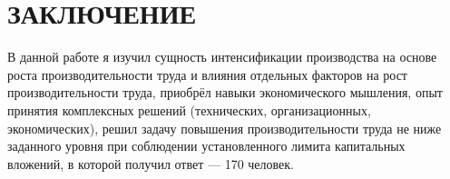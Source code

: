 \section*{ЗАКЛЮЧЕНИЕ}

В данной работе я изучил сущность интенсификации производства на основе роста
производительности труда и влияния отдельных факторов на рост производительности труда,
приобрёл навыки экономического мышления, опыт принятия комплексных
решений (технических, организационных, экономических), решил задачу повышения
производительности труда не ниже заданного уровня при соблюдении
установленного лимита капитальных вложений, в которой получил ответ --- 170 человек.

\newpage
